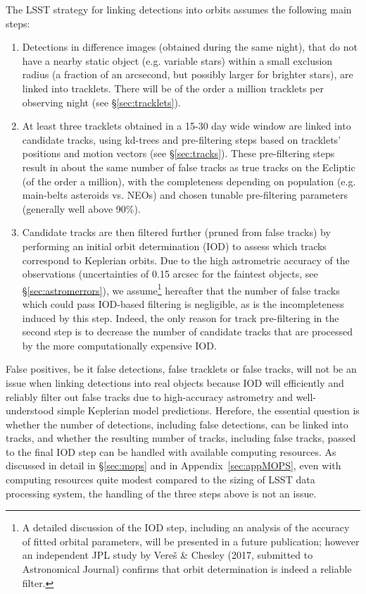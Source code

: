 The LSST strategy for linking detections into orbits assumes the following main steps:
\begin{enumerate}
\item Detections in difference images (obtained during the same night), that do not
         have a nearby static object (e.g. variable stars) within a small exclusion radius
         (a fraction of an arcsecond, but possibly larger for brighter stars), are linked into tracklets. There will be of the order
         a million tracklets per observing night (see \S\ref{sec:tracklets}).
\item At least three tracklets obtained in a 15-30 day wide window are linked into
         candidate tracks, using kd-trees and pre-filtering steps based on tracklets' positions
         and motion vectors (see \S\ref{sec:tracks}). These pre-filtering steps result in
         about the same number of false tracks as true tracks on the Ecliptic (of the order
         a million), with the completeness depending on population (e.g. main-belts
         asteroids vs. NEOs) and chosen tunable pre-filtering parameters (generally well above 90\%).
\item Candidate tracks are then filtered further (pruned from false tracks) by
        performing an initial orbit determination (IOD) to assess which tracks
        correspond to Keplerian orbits. Due to the high astrometric accuracy of the observations (uncertainties of 0.15 arcsec for the faintest objects,
         see \S\ref{sec:astromerrors}), we assume\footnote{A detailed discussion of the IOD step, 
         including an analysis of the accuracy of fitted orbital parameters,  will be presented in 
         a future publication; however an independent JPL study by Vere\v{s} \& Chesley 
         (2017, submitted to Astronomical Journal) confirms that orbit determination is indeed a reliable filter.} 
         hereafter that the number of false tracks which 
         could pass IOD-based filtering is negligible, as is the incompleteness induced by this 
         step. Indeed, the only reason for track pre-filtering in the second step is to decrease the 
         number of candidate tracks that are processed by the more computationally expensive IOD.
\end{enumerate}

False positives, be it false detections, false tracklets or false tracks, will not be
an issue when linking detections into real objects because IOD will efficiently and reliably filter out false tracks due to high-accuracy
astrometry and well-understood simple Keplerian model predictions. Herefore, the
essential question is whether the number of detections, including false detections, can be linked into tracks, and whether the resulting
number of tracks, including false tracks, passed to the final IOD step can be handled with available computing resources.
As discussed in detail in \S\ref{sec:mops}
and in Appendix~\ref{sec:appMOPS}, even with computing resources quite modest compared to the
sizing of LSST data processing system, the handling of the three steps above is not an issue.
